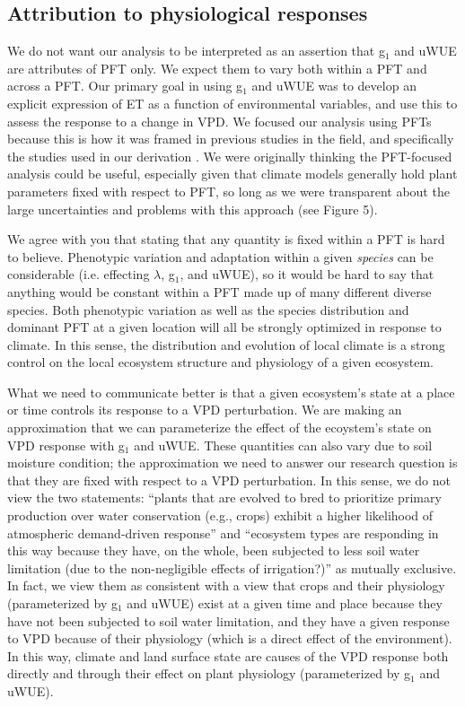 \subsection{Attribution to physiological responses}

We do not want our analysis to be interpreted as an assertion that
g$_1$ and uWUE are attributes of PFT only. We expect them to vary both
within a PFT and across a PFT. Our primary goal in using g$_1$ and
uWUE was to develop an explicit expression of ET as a function of
environmental variables, and use this to assess the response to a
change in VPD. We focused our analysis using PFTs because this is how
it was framed in previous studies in the field, and specifically the
studies used in our derivation \citep{Zhou_2014, Zhou_2015,
  Medlyn_2017}. We were originally thinking the PFT-focused analysis
could be useful, especially given that climate models generally hold
plant parameters fixed with respect to PFT, so long as we were
transparent about the large uncertainties and problems with this
approach (see Figure 5).

We agree with you that stating that any quantity is fixed within a PFT
is hard to believe. Phenotypic variation and adaptation within a given
\textit{species} can be considerable (i.e. effecting $\lambda$, g$_1$, and
uWUE), so it would be hard to say that anything would be constant
within a PFT made up of many different diverse species. Both
phenotypic variation as well as the species distribution and dominant
PFT at a given location will all be strongly optimized in response to
climate. In this sense, the distribution and evolution of local
climate is a strong control on the local ecosystem structure and
physiology of a given ecosystem.

What we need to communicate better is that a given ecosystem's state
at a place or time controls its response to a VPD perturbation. We are
making an approximation that we can parameterize the effect of the
ecoystem's state on VPD response with g$_1$ and uWUE. These quantities
can also vary due to soil moisture condition; the approximation we
need to answer our research question is that they are fixed
with respect to a VPD perturbation. In this sense, we do not view the
two statements: ``plants that are evolved to bred to prioritize
primary production over water conservation (e.g., crops) exhibit a
higher likelihood of atmospheric demand-driven response'' and
``ecosystem types are responding in this way because they have, on the
whole, been subjected to less soil water limitation (due to the
non-negligible effects of irrigation?)'' as mutually exclusive. In
fact, we view them as consistent with a view that crops and their
physiology (parameterized by g$_1$ and uWUE) exist at a given time and
place because they have not been subjected to soil water limitation,
and they have a given response to VPD because of their physiology
(which is a direct effect of the environment). In this way, climate
and land surface state are causes of the VPD response both directly
and through their effect on plant physiology (parameterized by g$_1$
and uWUE).

